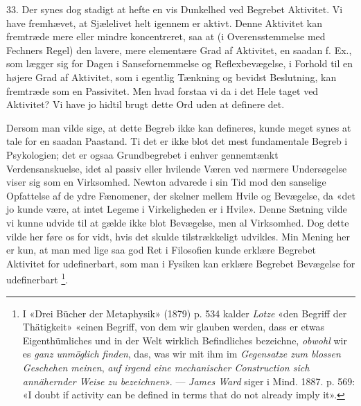 \documentclass[12pt,a4paper,openany]{book}
\begin{document}
33. Der synes dog stadigt at hefte en vis Dunkelhed ved Begrebet Aktivitet. Vi
have fremhævet, at Sjælelivet helt igennem er aktivt. Denne Aktivitet kan
fremtræde mere eller mindre koncentreret, saa at (i Overensstemmelse med
Fechners Regel) den lavere, mere elementære Grad af Aktivitet, en saadan f.
Ex., som lægger sig for Dagen i Sansefornemmelse og Reflexbevægelse, i Forhold
til en højere Grad af Aktivitet, som i egentlig Tænkning og bevidst Beslutning,
kan fremtræde som en Passivitet. Men hvad forstaa vi da i det Hele taget ved
Aktivitet? Vi have jo hidtil brugt dette Ord uden at definere det.

Dersom man vilde sige, at dette Begreb ikke kan defineres, kunde meget synes at
tale for en saadan Paastand. Ti det er ikke blot det mest fundamentale Begreb i
Psykologien; det er ogsaa Grundbegrebet i enhver gennemtænkt Verdensanskuelse,
idet al passiv eller hvilende Væren ved nærmere Undersøgelse viser sig som en
Virksomhed. Newton advarede i sin Tid mod den sanselige Opfattelse af de ydre
Fænomener, der skelner mellem Hvile og Bevægelse, da «det jo kunde være, at
intet Legeme i Virkeligheden er i Hvile». Denne Sætning vilde vi kunne udvide
til at gælde ikke blot Bevægelse, men al Virksomhed. Dog dette vilde her føre
os for vidt, hvis det skulde tilstrækkeligt udvikles. Min Mening her er kun, at
man med lige saa god Ret i Filosofien kunde erklære Begrebet Aktivitet for
udefinerbart, som man i Fysiken kan erklære Begrebet Bevægelse for udefinerbart%
\footnote[1]{I «Drei Bücher der Metaphysik» (1879) p. 534 kalder \emph{Lotze}
«den Begriff der Thätigkeit» «einen Begriff, von dem wir glauben werden, dass
er etwas Eigenthümliches und in der Welt wirklich Befindliches bezeichne,
\emph{obwohl} wir es \emph{ganz unmöglich finden}, das, was wir mit ihm im
\emph{Gegensatze zum blossen Geschehen meinen}, \emph{auf irgend eine
mechanischer Construction sich annähernder Weise zu bezeichnen}». ---
\emph{James Ward} siger i Mind. 1887. p. 569: «I doubt if activity can be
defined in terms that do not already imply it».}.
\end{document}
